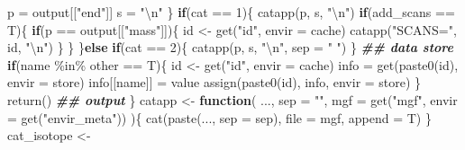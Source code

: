 \documentclass[
]{article}
\newenvironment{Shaded}{\begin{snugshade}}{\end{snugshade}}
\newcommand{\AttributeTok}[1]{\textcolor[rgb]{0.77,0.63,0.00}{#1}}
\newcommand{\ControlFlowTok}[1]{\textcolor[rgb]{0.13,0.29,0.53}{\textbf{#1}}}
\newcommand{\DecValTok}[1]{\textcolor[rgb]{0.00,0.00,0.81}{#1}}
\newcommand{\DocumentationTok}[1]{\textcolor[rgb]{0.56,0.35,0.01}{\textbf{\textit{#1}}}}
\newcommand{\FunctionTok}[1]{\textcolor[rgb]{0.00,0.00,0.00}{#1}}
\newcommand{\NormalTok}[1]{#1}
\newcommand{\OtherTok}[1]{\textcolor[rgb]{0.56,0.35,0.01}{#1}}
\newcommand{\SpecialCharTok}[1]{\textcolor[rgb]{0.00,0.00,0.00}{#1}}
\newcommand{\StringTok}[1]{\textcolor[rgb]{0.31,0.60,0.02}{#1}}
\begin{document}
\begin{Shaded}
\begin{Highlighting}[]
\NormalTok{      p }\OtherTok{=}\NormalTok{ output[[}\StringTok{"end"}\NormalTok{]]}
\NormalTok{      s }\OtherTok{=} \StringTok{"}\SpecialCharTok{\textbackslash{}n}\StringTok{"}
\NormalTok{    \}}
    \ControlFlowTok{if}\NormalTok{(cat }\SpecialCharTok{==} \DecValTok{1}\NormalTok{)\{}
      \FunctionTok{catapp}\NormalTok{(p, s, }\StringTok{"}\SpecialCharTok{\textbackslash{}n}\StringTok{"}\NormalTok{)}
      \ControlFlowTok{if}\NormalTok{(add\_scans }\SpecialCharTok{==}\NormalTok{ T)\{}
        \ControlFlowTok{if}\NormalTok{(p }\SpecialCharTok{==}\NormalTok{ output[[}\StringTok{"mass"}\NormalTok{]])\{}
\NormalTok{          id }\OtherTok{\textless{}{-}} \FunctionTok{get}\NormalTok{(}\StringTok{"id"}\NormalTok{, }\AttributeTok{envir =}\NormalTok{ cache)}
          \FunctionTok{catapp}\NormalTok{(}\StringTok{"SCANS="}\NormalTok{, id, }\StringTok{"}\SpecialCharTok{\textbackslash{}n}\StringTok{"}\NormalTok{)}
\NormalTok{        \}}
\NormalTok{      \}}
\NormalTok{    \}}\ControlFlowTok{else} \ControlFlowTok{if}\NormalTok{(cat }\SpecialCharTok{==} \DecValTok{2}\NormalTok{)\{}
      \FunctionTok{catapp}\NormalTok{(p, s, }\StringTok{"}\SpecialCharTok{\textbackslash{}n}\StringTok{"}\NormalTok{, }\AttributeTok{sep =} \StringTok{" "}\NormalTok{)}
\NormalTok{    \}}
    \DocumentationTok{\#\# data store}
    \ControlFlowTok{if}\NormalTok{(name }\SpecialCharTok{\%in\%}\NormalTok{ other }\SpecialCharTok{==}\NormalTok{ T)\{}
\NormalTok{      id }\OtherTok{\textless{}{-}} \FunctionTok{get}\NormalTok{(}\StringTok{"id"}\NormalTok{, }\AttributeTok{envir =}\NormalTok{ cache)}
\NormalTok{      info }\OtherTok{=} \FunctionTok{get}\NormalTok{(}\FunctionTok{paste0}\NormalTok{(id), }\AttributeTok{envir =}\NormalTok{ store)}
\NormalTok{      info[[name]] }\OtherTok{=}\NormalTok{ value}
      \FunctionTok{assign}\NormalTok{(}\FunctionTok{paste0}\NormalTok{(id), info, }\AttributeTok{envir =}\NormalTok{ store)}
\NormalTok{    \}}
    \FunctionTok{return}\NormalTok{()}
    \DocumentationTok{\#\# output}
\NormalTok{  \}}
\NormalTok{catapp }\OtherTok{\textless{}{-}}
  \ControlFlowTok{function}\NormalTok{(}
\NormalTok{    ...,}
    \AttributeTok{sep =} \StringTok{""}\NormalTok{,}
    \AttributeTok{mgf =} \FunctionTok{get}\NormalTok{(}\StringTok{"mgf"}\NormalTok{, }\AttributeTok{envir =} \FunctionTok{get}\NormalTok{(}\StringTok{"envir\_meta"}\NormalTok{))}
\NormalTok{    )\{}
    \FunctionTok{cat}\NormalTok{(}\FunctionTok{paste}\NormalTok{(..., }\AttributeTok{sep =}\NormalTok{ sep), }\AttributeTok{file =}\NormalTok{ mgf, }\AttributeTok{append =}\NormalTok{ T)}
\NormalTok{  \}}
\NormalTok{cat\_isotope }\OtherTok{\textless{}{-}} 

\end{Highlighting}
\end{Shaded}
\end{document}
